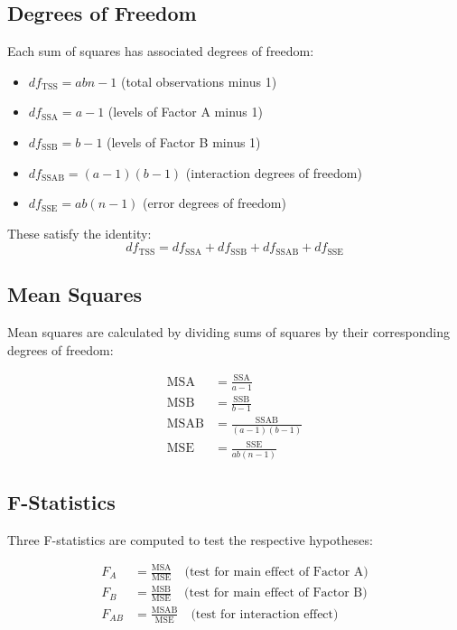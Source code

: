 \documentclass[twoside]{book}
\begin{document}
\subsection{Degrees of Freedom}

Each sum of squares has associated degrees of freedom:

\begin{itemize}
\item $df_{\text{TSS}} = abn - 1$ (total observations minus 1)
\item $df_{\text{SSA}} = a - 1$ (levels of Factor A minus 1)
\item $df_{\text{SSB}} = b - 1$ (levels of Factor B minus 1)
\item $df_{\text{SSAB}} = (a-1)(b-1)$ (interaction degrees of freedom)
\item $df_{\text{SSE}} = ab(n-1)$ (error degrees of freedom)
\end{itemize}

These satisfy the identity:
\[
df_{\text{TSS}} = df_{\text{SSA}} + df_{\text{SSB}} + df_{\text{SSAB}} + df_{\text{SSE}}
\]

\subsection{Mean Squares}

Mean squares are calculated by dividing sums of squares by their corresponding degrees of freedom:

\begin{align*}
\text{MSA} &= \frac{\text{SSA}}{a-1} \\[0.3em]
\text{MSB} &= \frac{\text{SSB}}{b-1} \\[0.3em]
\text{MSAB} &= \frac{\text{SSAB}}{(a-1)(b-1)} \\[0.3em]
\text{MSE} &= \frac{\text{SSE}}{ab(n-1)}
\end{align*}

\subsection{F-Statistics}

Three F-statistics are computed to test the respective hypotheses:

\begin{textbox}
\begin{align*}
F_A &= \frac{\text{MSA}}{\text{MSE}} \quad \text{(test for main effect of Factor A)} \\[0.3em]
F_B &= \frac{\text{MSB}}{\text{MSE}} \quad \text{(test for main effect of Factor B)} \\[0.3em]
F_{AB} &= \frac{\text{MSAB}}{\text{MSE}} \quad \text{(test for interaction effect)}
\end{align*}
\end{textbox}
\end{document}
